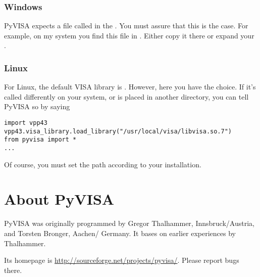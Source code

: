 \documentclass{howto}
\begin{document}
\subsubsection{Windows}

PyVISA expects a file called  in the \@.  You
must assure that this is the case.  For example, on my system you find this
file in .  Either copy it there or expand your
\@.


\subsubsection{Linux}

For Linux, the default VISA library is
.  However, here you have the
choice.  If it's called differently on your system, or is placed in another
directory, you can tell PyVISA so by saying
\begin{verbatim}
import vpp43
vpp43.visa_library.load_library("/usr/local/visa/libvisa.so.7")
from pyvisa import *
...
\end{verbatim}
Of course, you must set the path according to your installation.


\section{About PyVISA}

PyVISA was originally programmed by Gregor Thalhammer, Innsbruck/Austria, and
Torsten Bronger, Aachen/\hskip0pt Germany.  It bases on earlier experiences by
Thalhammer.

Its homepage is \url{http://sourceforge.net/projects/pyvisa/}.  Please report
bugs there.
\end{document}
